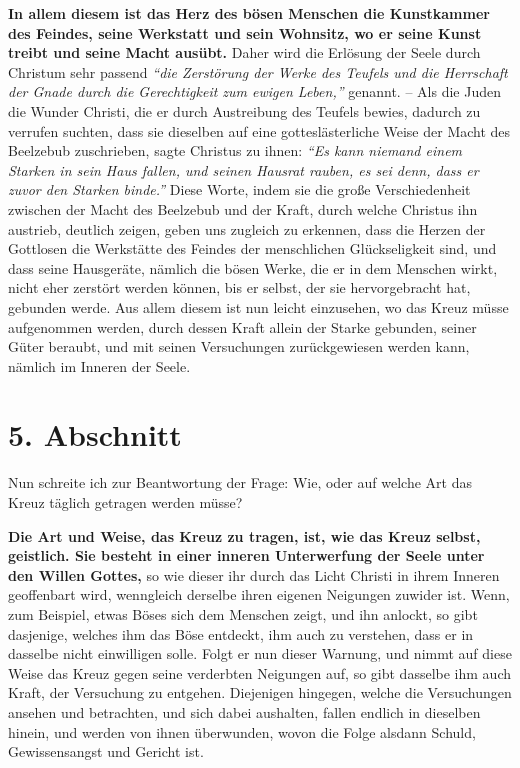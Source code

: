 \label{ref:03_04_reich_des_boesen}
\textbf{In allem diesem ist das Herz des bösen Menschen die Kunstkammer des
Feindes, seine Werkstatt und sein Wohnsitz, wo er seine Kunst treibt und seine
Macht ausübt.} Daher wird die Erlösung der Seele durch Christum sehr passend
\textit{"`die Zerstörung der Werke des Teufels und die Herrschaft der Gnade
durch die Gerechtigkeit zum ewigen Leben,"'}
genannt. -- Als
die Juden die Wunder Christi, die er durch Austreibung des Teufels bewies,
dadurch zu verrufen suchten, dass sie dieselben auf eine gotteslästerliche Weise
der Macht des Beelzebub zuschrieben, sagte Christus zu ihnen:
\textit{"`Es kann niemand einem Starken in sein Haus fallen, und seinen
Hausrat rauben, es sei denn, dass er zuvor den Starken binde."'}
Diese Worte, indem sie die
große Verschiedenheit zwischen der Macht des Beelzebub und der Kraft, durch
welche Christus ihn austrieb, deutlich zeigen, geben uns zugleich zu erkennen,
dass die Herzen der Gottlosen die Werkstätte des Feindes der menschlichen
Glückseligkeit sind, und dass seine Hausgeräte, nämlich die bösen Werke, die er
in dem Menschen wirkt, nicht eher zerstört werden können, bis er selbst, der
sie hervorgebracht hat, gebunden werde. Aus allem diesem ist nun leicht
einzusehen, wo das Kreuz müsse aufgenommen werden, durch dessen Kraft allein der
Starke gebunden, seiner Güter beraubt, und mit seinen Versuchungen
zurückgewiesen werden kann, nämlich im Inneren der Seele.

\section{5. Abschnitt} \label{kap3_ab5}

Nun schreite ich zur Beantwortung der Frage: Wie, oder auf welche Art das Kreuz
täglich getragen werden müsse?

\medskip

\label{ref:03_05_kreuz_auf_sich_nehmen}
\textbf{Die Art und Weise, das Kreuz zu tragen, ist, wie das Kreuz selbst,
geistlich.
Sie besteht in einer inneren Unterwerfung der Seele unter den Willen Gottes,} so
wie dieser ihr durch das Licht Christi in ihrem Inneren geoffenbart wird,
wenngleich derselbe ihren eigenen Neigungen zuwider ist. Wenn, zum Beispiel,
etwas Böses sich dem Menschen zeigt, und ihn anlockt, so gibt dasjenige,
welches ihm das Böse entdeckt, ihm auch zu verstehen, dass er in dasselbe nicht
einwilligen solle. Folgt er nun dieser Warnung, und nimmt auf diese Weise das
Kreuz gegen seine verderbten Neigungen auf, so gibt dasselbe ihm auch Kraft,
der Versuchung zu entgehen. Diejenigen hingegen, welche die Versuchungen ansehen
und betrachten, und sich dabei aushalten, fallen endlich in dieselben hinein,
und werden von ihnen überwunden, wovon die Folge alsdann Schuld, Gewissensangst
und Gericht ist.

